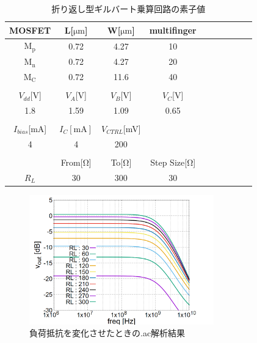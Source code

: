 \documentclass[twocolumn]{jsarticle}
\begin{document}
    \begin{table}[h]
        \caption{折り返し型ギルバート乗算回路の素子値}
        \label{table:sim_gd}
        \centering
        \begin{tabular}{cccccccccc}
            MOSFET & L[$\mathrm{\mu m}$] & W[$\mathrm{\mu m}$] & multifinger\\
            \hline \hline
            $\mathrm{M_{p}}$ & 0.72 & 4.27 & 10 \\
            $\mathrm{M_{n}}$ & 0.72 & 4.27 & 20 \\
            $\mathrm{M_{C}}$ & 0.72 & 11.6 & 40 \\
            &&&\\
            $V_{dd}$[V] & $V_{A}$[V] & $V_{B}$[V] & $V_{C}$[V]\\
            \hline\hline
            1.8 & 1.59 & 1.09 & 0.65 \\
            &&&\\
            $I_{bias}$[mA] & $I_{C}\mathrm{[mA]}$ & $V_{CTRL}$[mV] & \\
            \hline\hline
            4 & 4 & 200 & \\
            &&&\\
            & From[$\mathrm{\Omega}$] & To[$\mathrm{\Omega}$] & Step Size[$\mathrm{\Omega}$]\\
            \hline\hline
            $R_{L}$ & 30 & 300 & 30
        \end{tabular}
    \end{table}

    \newpage

    \begin{figure}[h]
        \begin{center}
            \includegraphics*[width=80mm]{graphes/bitmap/Fgd_vout_ac.PNG}
            \caption{負荷抵抗を変化させたときの.ac解析結果}
            \label{graph:fgd_vout_ac}
        \end{center}
    \end{figure}
\end{document}
